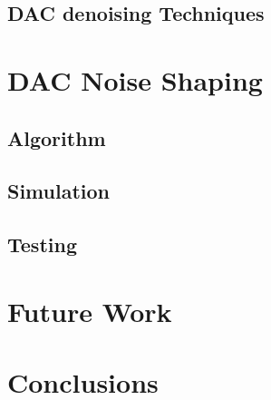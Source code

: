     \subsection{DAC denoising Techniques}
\section{DAC Noise Shaping}
    \subsection{Algorithm}
	\subsection{Simulation}
    \subsection{Testing}
\section{Future Work}
\section{Conclusions}